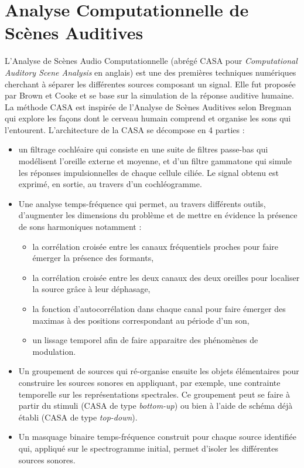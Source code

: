 \section{Analyse Computationnelle de Scènes Auditives }

L'Analyse de Scènes Audio Computationnelle (abrégé CASA pour \textit{Computational Auditory Scene Analysis} en anglais) est une des premières techniques numériques cherchant à séparer les différentes sources composant un signal. Elle fut proposée par Brown et Cooke \cite{brown1994computational} et se base sur la simulation de la réponse auditive humaine.
La méthode CASA est inspirée de l'Analyse de Scènes Auditives selon Bregman \cite{bregman1994auditory} qui explore les façons dont le cerveau humain comprend et organise les sons qui l'entourent. L'architecture de la CASA se décompose en 4 parties \cite{wang2006computational} :

\begin{itemize}
\item un filtrage cochléaire qui consiste en une suite de filtres passe-bas qui modélisent l'oreille externe et moyenne, et d'un filtre gammatone qui simule les réponses impulsionnelles de chaque cellule ciliée. Le signal obtenu est exprimé, en sortie, au travers d'un cochléogramme.
\item Une analyse temps-fréquence qui permet, au travers différents outils, d'augmenter les dimensions du problème et de mettre en évidence la présence de sons harmoniques notamment :
\begin{itemize}[label=$\bullet$]
\item la corrélation croisée entre les canaux fréquentiels proches pour faire émerger la présence des formants,
\item la corrélation croisée entre les deux canaux des deux oreilles pour localiser la source grâce à leur déphasage,
\item la fonction d'autocorrélation dans chaque canal pour faire émerger des maximas à des positions correspondant au période d'un son,
\item un lissage temporel afin de faire apparaitre des phénomènes de modulation.
\end{itemize}
\item Un groupement de sources qui ré-organise ensuite les objets élémentaires pour construire les sources sonores en appliquant, par exemple, une contrainte temporelle  sur les représentations spectrales. Ce groupement peut se faire à partir du stimuli (CASA de type \textit{bottom-up}) ou bien à l'aide de schéma déjà établi (CASA de type \textit{top-down}).
\item Un masquage binaire temps-fréquence construit pour chaque source identifiée qui, appliqué sur le spectrogramme initial, permet d'isoler les différentes sources sonores.\\
\end{itemize}

